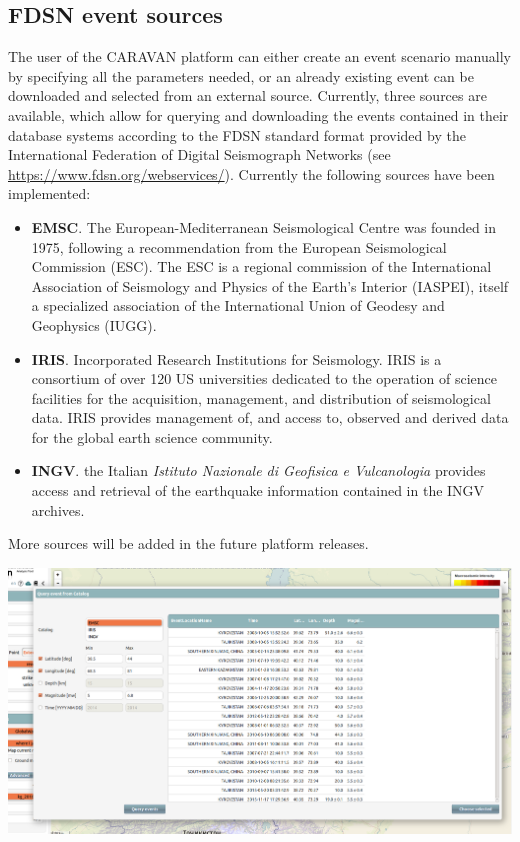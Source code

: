 \documentclass[12p]{article}
\begin{document}
\subsection{FDSN event sources}
\label{sec:web gui/ev sources}

The user of the CARAVAN platform can either create an event scenario manually by
specifying all the parameters needed, or an already existing
event can be downloaded and selected from an external source. 
Currently, three sources are available, which allow for querying and downloading
the events contained in their database systems according to the FDSN standard
format provided by the International Federation of Digital Seismograph Networks
(see \url{https://www.fdsn.org/webservices/}). Currently the following sources
have been implemented:
\begin{itemize}
	\item{\textbf{EMSC}. The European-Mediterranean Seismological Centre was
founded in 1975, following a recommendation from the European Seismological
Commission (ESC). The ESC is a regional commission of the International
Association of Seismology and Physics of the Earth's Interior (IASPEI), itself a
specialized association of the International Union of Geodesy and Geophysics
(IUGG).}
	\item{\textbf{IRIS}. Incorporated Research Institutions for Seismology.
IRIS is a consortium of over 120 US universities dedicated to the operation of
science facilities for the acquisition, management, and distribution of
seismological data. IRIS provides management of, and access to, observed and
derived data for the global earth science community.}
	\item{\textbf{INGV}. the Italian \emph{Istituto Nazionale di Geofisica e
Vulcanologia} provides access and retrieval of the earthquake information
contained in the INGV archives.}
\end{itemize}
More sources will be added in the future platform releases. 
 
\begin{center}
	\includegraphics[width=\textwidth]{gui_fdsn}
\end{center}
\end{document}
